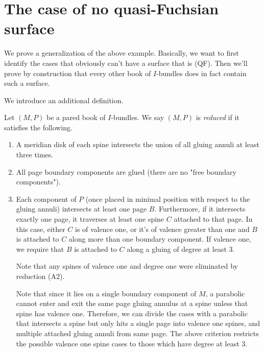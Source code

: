 \section{The case of no quasi-Fuchsian surface}

We prove a generalization of the above example. Basically, we want to first
identify the cases that obviously can't have a surface that is (QF). Then we'll
prove by construction that every other book of $I$-bundles does in fact contain
such a surface.

We introduce an additional definition.

\begin{defn}

Let $(M,P)$ be a pared book of $I$-bundles. We say $(M,P)$ is \emph{reduced} if
it satisfies the following.

\begin{enumerate}

\item A meridian disk of each spine intersects the union of all gluing annuli
at least three times.

\item All page boundary components are glued (there are no "free boundary
components").

\item Each component of $P$ (once placed in minimal position with respect to
the gluing annuli) intersects at least one page $B$. Furthermore, if it
intersects exactly one page, it traverses at least one spine $C$ attached to
that page. In this case, either $C$ is of valence one, or it's of valence
greater than one and $B$ is attached to $C$ along more than one boundary
component.  If valence one, we require that $B$ is attached to $C$ along
a gluing of degree at least 3.

Note that any spines of valence one and degree one were eliminated by reduction
(A2).

Note that since it lies on a single boundary component of $M$, a parabolic
cannot enter and exit the same page gluing annulus at a spine unless that spine
has valence one. Therefore, we can divide the cases with a parabolic that
intersects a spine but only hits a single page into valence one spines, and
multiple attached gluing annuli from same page. The above criterion restricts
the possible valence one spine cases to those which have degree at least 3.

\end{enumerate}

\end{defn}

